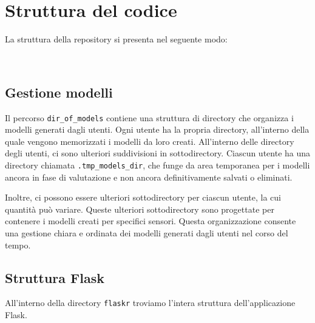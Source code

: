 \documentclass{rapportECL}
\begin{document}
\chapter{Struttura del codice}
\label{cha:struttura}

La struttura della repository si presenta nel seguente modo:

~

\section{Gestione modelli}
Il percorso \texttt{dir\_of\_models} contiene una struttura di directory che organizza i modelli generati dagli utenti. Ogni utente ha la propria directory, 
all'interno della quale vengono memorizzati i modelli da loro creati. All'interno delle directory degli utenti, 
ci sono ulteriori suddivisioni in sottodirectory. Ciascun utente ha una directory chiamata \texttt{.tmp\_models\_dir}, che funge da area temporanea per 
i modelli ancora in fase di valutazione e non ancora definitivamente salvati o eliminati.

Inoltre, ci possono essere ulteriori sottodirectory per ciascun utente, la cui quantità può variare. 
Queste ulteriori sottodirectory sono progettate per contenere i modelli creati per specifici sensori. 
Questa organizzazione consente una gestione chiara e ordinata dei modelli generati dagli utenti nel corso del tempo.

\section{Struttura Flask}
All'interno della directory \texttt{flaskr} troviamo l'intera struttura dell'applicazione Flask.
\end{document}
